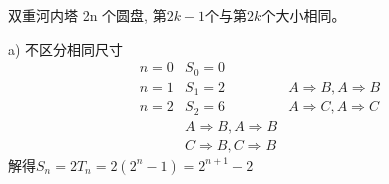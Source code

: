 \begin{exercise}
	双重河内塔 2n 个圆盘, 第$ 2k-1 $个与第$ 2k $个大小相同。
\end{exercise}

\begin{answer}
	a) 不区分相同尺寸
	\begin{equation*}
		\begin{aligned}
			n=0 & S_0=0	& \\
			n=1 & S_1=2	& A \Rightarrow B, A \Rightarrow B\\
			n=2 & S_2=6	& A \Rightarrow C, A \Rightarrow C\\
						& A \Rightarrow B, A \Rightarrow B\\
						& C \Rightarrow B, C \Rightarrow B
		\end{aligned}
	\end{equation*}
	解得$ S_n = 2T_n = 2(2^n-1)=2^{n+1}-2 $
	

\end{answer}
